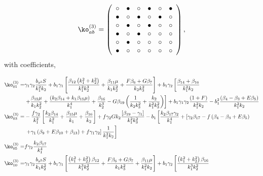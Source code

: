{\begin{equation}
\ko^{(3)}_{ab}= 
 \left( \begin {array}{cccccc} \circ &\bullet &\circ &\bullet 
&\circ &\bullet \\  \bullet &\circ &
\bullet &\circ &\bullet &\circ \\  \circ &
\bullet &\circ &\bullet &\circ &\circ \\  
\bullet &\circ &\bullet &\circ &\circ &\circ 
\\  \circ &\bullet &\circ &\circ &\circ &
\circ \\  \bullet &\circ &\circ &\circ &
\circ &\circ \end {array} \right), 
\end{equation}
with coefficients,

\begin{align*}
\ko_{01}^{(3)}=& \gamma_1 \gamma_2 \frac{b_{s^2} S}{k_1^2 k_2} + b_1 \gamma_1 \left[\frac{\beta_{12}\left(k_1^2 + k_2^2\right)}{k_1^2 k_2^3} + \frac{\beta_{11} \mu}{k_1 k_2^2} + \frac{F \beta_{6} + G \beta_{7}}{k_2 k_3^2} \right] + b_1 \gamma_2 \left[ \frac{\beta_{14} + \beta_{16}}{k_1^2 k_2} \right. \\
&\left. + \frac{\beta_{15}\mu}{k_1 k_2^2} + \frac{\left(k_2 \beta_{14} + k_1 \beta_{15} \mu\right)}{k_1^4} + \frac{\beta_{16}}{k_2^3} - G \beta_{19} \left( \frac{1}{k_2 k_3^2} + \frac{k_2}{k_1^2 k_3^2}\right)\right] + b_1 \gamma_1 \gamma_2 \frac{\left(1+F\right)}{k_1^2 k_2} - b_1^2 \frac{\left({\beta_{4}-\beta_{3}} + E \beta_{5}\right)}{k_1^2 k_2}\\
\ko_{03}^{(3)}=& - \frac{f \gamma_2}{k_1^2} \left[ \frac{k_2 \beta_{14}}{k_1^2} + \frac{\beta_{15}\mu}{k_1} + \frac{\beta_{16}}{k_2} \right] + f \gamma_2 G k_2 \frac{\left[ \beta_{19} - \gamma_1 \right]}{k_1^2 k_3^2} - b_1 \left[ \frac{k_2 \beta_{17} \gamma_2}{k_1^4}  + \left[ \gamma_2 \beta_{17} - f \left( {\beta_{4}-\beta_{3}} + E \beta_{5}\right) \right. \right. \\
&\left. \left. + \gamma_1 \left( \beta_{9} + E \beta_{10} + \beta_{13} \right) + f \gamma_1 \gamma_2 \right] \frac{1}{k_1^2 k_2}\right]\\
\ko_{05}^{(3)}=&  f \gamma_2 \frac{k_2 \beta_{17}}{k_1^4} \\
\ko_{10}^{(3)}=& \gamma_1 \gamma_2 \frac{b_{s^2} S}{k_1 k_2^2} + b_1 \gamma_1 \left[ \frac{\left(k_1^2 + k_2^2\right)\beta_{12}}{k_1^3 k_2^2} + \frac{F \beta_{6} + G \beta_{7}}{k_1 k_3^2} + \frac{\beta_{11}\mu}{k_1^2 k_2}  \right] + b_1 \gamma_2 \left[ \frac{\left(k_1^2 + k_2^2\right) \beta_{16}}{k_1^3 k_2^2} \right. \\

\end{align*}}
